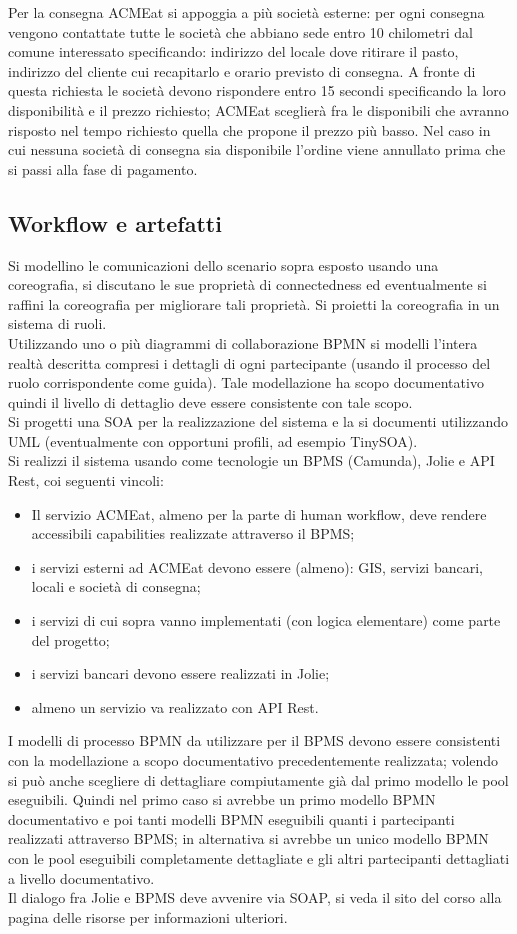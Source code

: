 \documentclass[11pt]{article} %
\begin{document}
Per la consegna ACMEat si appoggia a più società esterne: per ogni consegna vengono contattate tutte le società che abbiano sede entro 10 chilometri dal comune interessato specificando: indirizzo del locale dove ritirare il pasto, indirizzo del cliente cui recapitarlo e orario previsto di consegna. A fronte di questa richiesta le società devono rispondere entro 15 secondi specificando la loro disponibilità e il prezzo richiesto; ACMEat sceglierà fra le disponibili che avranno risposto nel tempo richiesto quella che propone il prezzo più basso. Nel caso in cui nessuna società di consegna sia disponibile l’ordine viene annullato prima che si passi alla fase di pagamento.

\subsection{Workflow e artefatti}
Si modellino le comunicazioni dello scenario sopra esposto usando una coreografia, si discutano le sue proprietà di connectedness ed eventualmente si raffini la coreografia per migliorare tali proprietà. Si proietti la coreografia in un sistema di ruoli.\\
Utilizzando uno o più diagrammi di collaborazione BPMN si modelli l’intera realtà descritta compresi i dettagli di ogni partecipante (usando il processo del ruolo corrispondente come guida). Tale modellazione ha scopo documentativo quindi il livello di dettaglio deve essere consistente con tale scopo.\\
Si progetti una SOA per la realizzazione del sistema e la si documenti utilizzando UML (eventualmente con opportuni profili, ad esempio TinySOA).\\
Si realizzi il sistema usando come tecnologie un BPMS (Camunda), Jolie e API Rest, coi seguenti vincoli:
\begin{itemize}
\item Il servizio ACMEat, almeno per la parte di human workflow, deve rendere accessibili capabilities realizzate attraverso il BPMS;
\item i servizi esterni ad ACMEat devono essere (almeno): GIS, servizi bancari, locali e società di consegna;
\item i servizi di cui sopra vanno implementati (con logica elementare) come parte del progetto;
\item i servizi bancari devono essere realizzati in Jolie;
\item almeno un servizio va realizzato con API Rest.
\end{itemize}
I modelli di processo BPMN da utilizzare per il BPMS devono essere consistenti con la modellazione a scopo documentativo precedentemente realizzata; volendo si può anche scegliere di dettagliare compiutamente già dal primo modello le pool eseguibili. Quindi nel primo caso si avrebbe un primo modello BPMN documentativo e poi tanti modelli BPMN eseguibili quanti i partecipanti realizzati attraverso BPMS; in alternativa si avrebbe un unico modello BPMN con le pool eseguibili completamente dettagliate e gli altri partecipanti dettagliati a livello documentativo.\\
Il dialogo fra Jolie e BPMS deve avvenire via SOAP, si veda il sito del corso alla pagina delle risorse per informazioni ulteriori.
\end{document}
